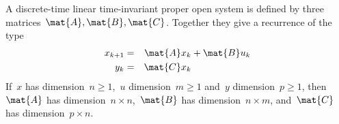   \label{ex:discrete-time-linear}
  \begin{definition}
    \label{def:dicrete-time-linear-system}
    A discrete-time linear time-invariant proper open system is defined by three matrices~$\mat{A},\mat{B},\mat{C}$.
    Together they give a recurrence of the type
    \begin{equation} \label{eq:discrete-time-dynamics}
      \begin{aligned}
        x_{k+1} &=& \mat{A} x_k & + \mat{B} u_k \\
        y_{k}   &=& \mat{C} x_k  \\
      \end{aligned}
    \end{equation}
    If~$x$ has dimension~$n\geq1$,~$u$ dimension~$m\geq1$ and~$y$ dimension~$p\geq1$, then~$\mat{A}$ has dimension~$n \times n$,~$\mat{B}$ has dimension~$n \times m$, and~$\mat{C}$ has dimension~$p \times n$.
  \end{definition}

